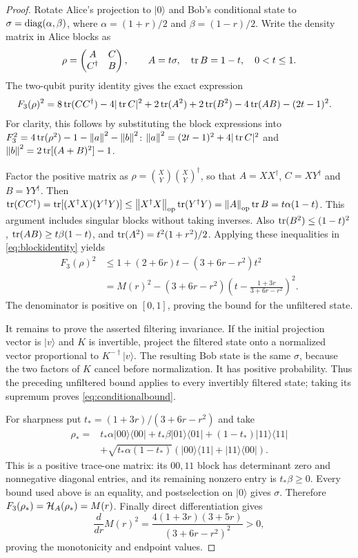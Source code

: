 \begin{proof}
Rotate Alice's projection to $|0\rangle$ and Bob's conditional state to
$\sigma=\operatorname{diag}(\alpha,\beta)$, where
$\alpha=(1+r)/2$ and $\beta=(1-r)/2$.
Write the density matrix in Alice blocks as
\[
 \rho=\begin{pmatrix}A&C\\C^\dagger&B\end{pmatrix},
 \qquad A=t\sigma,\quad \operatorname{tr} B=1-t,\quad0<t\leq1.
\]
The two-qubit purity identity gives the exact expression
\begin{align}\label{eq:blockidentity}
 F_3(\rho)^2={}&8\operatorname{tr}(CC^\dagger)-4|\operatorname{tr} C|^2
 +2\operatorname{tr}(A^2)+2\operatorname{tr}(B^2)-4\operatorname{tr}(AB)-(2t-1)^2.
\end{align}
For clarity, this follows by substituting the block expressions into
$F_3^2=4\operatorname{tr}(\rho^2)-1-\left\lVert a\right\rVert^2-\left\lVert b\right\rVert^2$:
$\left\lVert a\right\rVert^2=(2t-1)^2+4|\operatorname{tr} C|^2$ and
$\left\lVert b\right\rVert^2=2\operatorname{tr}[(A+B)^2]-1$.

Factor the positive matrix as
$\rho=\binom XY\binom XY^\dagger$, so that
$A=XX^\dagger$, $C=XY^\dagger$ and $B=YY^\dagger$.
Then
$\operatorname{tr}(CC^\dagger)=\operatorname{tr}[(X^\dagger X)(Y^\dagger Y)]
\leq\left\lVert X^\dagger X\right\rVert_{\rm op}\operatorname{tr}(Y^\dagger Y)
=\left\lVert A\right\rVert_{\rm op}\operatorname{tr} B=t\alpha(1-t)$.
This argument includes singular blocks without taking inverses.
Also $\operatorname{tr}(B^2)\leq(1-t)^2$,
$\operatorname{tr}(AB)\geq t\beta(1-t)$, and
$\operatorname{tr}(A^2)=t^2(1+r^2)/2$.
Applying these inequalities in \eqref{eq:blockidentity} yields
\begin{align}\label{eq:conditionalparabola}
 F_3(\rho)^2
 &\leq1+(2+6r)t-(3+6r-r^2)t^2\\
 &=M(r)^2-(3+6r-r^2)
       \left(t-\frac{1+3r}{3+6r-r^2}\right)^2.\nonumber
\end{align}
The denominator is positive on $[0,1]$, proving the bound for the
unfiltered state.

It remains to prove the asserted filtering invariance. If the initial
projection vector is $|v\rangle$ and $K$ is invertible, project the filtered
state onto a normalized vector proportional to $K^{-\dagger}|v\rangle$.
The resulting Bob state is the same $\sigma$, because the two factors
of $K$ cancel before normalization. It has positive probability.
Thus the preceding unfiltered bound applies to every invertibly filtered
state; taking its supremum proves \eqref{eq:conditionalbound}.

For sharpness put $t_*=(1+3r)/(3+6r-r^2)$ and take
\begin{align}\label{eq:sharpconditional}
 \rho_*={}&t_*\alpha|00\rangle\langle00|
 +t_*\beta|01\rangle\langle01|
 +(1-t_*)|11\rangle\langle11|\nonumber\\
 &+\sqrt{t_*\alpha(1-t_*)}
      (|00\rangle\langle11|+|11\rangle\langle00|).
\end{align}
This is a positive trace-one matrix: its $00,11$ block has determinant
zero and nonnegative diagonal entries, and its remaining nonzero entry
is $t_*\beta\geq0$. Every bound used above is an equality, and
postselection on $|0\rangle$ gives $\sigma$.
Therefore $F_3(\rho_*)=\mathcal H_A(\rho_*)=M(r)$.
Finally direct differentiation gives
\[
 \frac{d}{dr}M(r)^2=
 \frac{4(1+3r)(3+5r)}{(3+6r-r^2)^2}>0,
\]
proving the monotonicity and endpoint values.
\end{proof}

